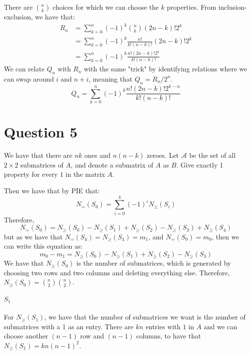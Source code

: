 \documentclass[]{article}
\begin{document}
There are $\binom{n}{k}$ choices for which we can choose the $k$ properties. From inclusion-exclusion, we have that:
\begin{align*}
	R_n &=  \sum_{k = 0}^n (-1)^k \binom{n}{k} (2n - k)!2^k\\ 
	&=  \sum_{k = 0}^n (-1)^k \frac{n!}{k! (n - k)!} (2n - k)!2^k\\
	&= \sum_{k = 0}^n (-1)^k \frac{n!(2n - k)! 2^k}{k! (n - k)!}
\end{align*}
We can relate $Q_n$ with $R_n$ with the same "trick" by identifying relations where we can swap around $i$ and $n+ i$, meaning that $Q_n = R_n/2^n$. 
\begin{equation}
	Q_n = \sum_{k = 0}^n (-1)^k \frac{n!(2n - k)! 2^{k - n}}{k! (n - k)!}
\end{equation}
\section{Question 5}
We have that there are $nk$ ones and $n(n-k)$ zeroes. 
Let $\mathcal{A}$ be the set of all $2 \times 2$ submatrices of $A$, and denote a submatrix of $A$ as $B$. Give exactly 1 property for every $1$ in the matrix $A$. 

Then we have that by PIE that:
\begin{equation}
	N_{=}(S_0) = \sum_{i= 0}^4 (-1)^{i} N_{\geq}(S_i) 
\end{equation}
Therefore, 
\begin{equation}
	N_{=}(S_0) = N_{\geq}(S_0) - N_{\geq}(S_1) + N_{\geq}(S_2) - N_{\geq}(S_3) + N_{\geq}(S_4)    
\end{equation}
but as we have that $N_{=}(S_4) = N_{\geq}(S_4) = m_1$, and $N_{=}(S_0) = m_0$, then we can write this equation as:
\begin{equation}
	m_0 - m_1 = N_{\geq}(S_0) - N_{\geq}(S_1) + N_{\geq}(S_2) - N_{\geq}(S_3)    
\end{equation}
We have that $N_{\geq}(S_0)$ is the number of submatrices, which is generated by choosing two rows and two columns and deleting everything else. Therefore, $N_{\geq}(S_0) = \binom{n}{2}\binom{n}{2}$.
\paragraph{$S_1$}
For $N_{\geq}(S_1)$, we have that the number of submatrices we want is the number of submatrices with a 1 as an entry. There are $kn$ entries with $1$ in $A$ and we can choose another $(n-1)$ row and $(n-1)$ columns, to have that $N_{\geq}(S_1) = kn(n-1)^2$.
\end{document}
